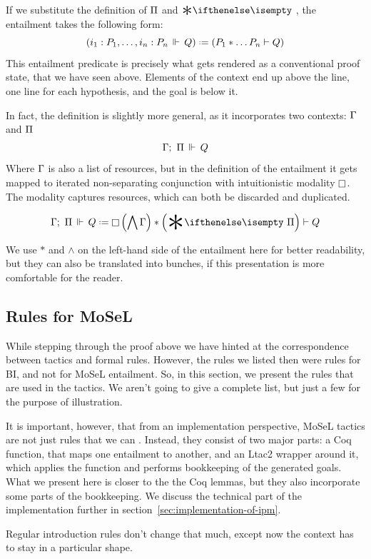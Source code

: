 If we substitute the definition of \(\Pi\) and \(\Sep\), the entailment takes the following form:
\[\left( \entailsOne {i_1 : P_1, \ldots , i_n : P_n} Q \right) \defeq
  \left( P_1 * \ldots P_n \vdash Q \right)\]
This entailment predicate is precisely what gets rendered as a conventional proof state, that we have seen above.
Elements of the context end up above the line, one line for each hypothesis, and the goal is below it.

In fact, the definition is slightly more general, as it incorporates two contexts: \(\Gamma\) and \(\Pi\)
\[\Gamma ;\,\, \Pi \,\Vdash\, Q\]
Where \(\Gamma\) is also a list of resources, but in the definition of the entailment it gets mapped to iterated non-separating conjunction with intuitionistic modality \(\mathop{\Box}\).
The modality captures resources, which can both be discarded and duplicated.

\[\entailsD Q \defeq \intuit \left(\bigwedge \IntuD\right) * \left(\Sep \SpatD\right) \vdash Q\]

We use \(\ast\) and \(\wedge\) on the left-hand side of the entailment here for better readability, but they can also be translated into bunches, if this presentation is more comfortable for the reader.

\subsection{Rules for MoSeL}
\label{sec:rules-regular-ipm}

While stepping through the proof above we have hinted at the correspondence between tactics and formal rules.
However, the rules we listed then were rules for BI, and not for MoSeL entailment.
So, in this section, we present the rules that are used in the tactics.
We aren't going to give a complete list, but just a few for the purpose of illustration.

It is important, however, that from an implementation perspective, MoSeL tactics are not just rules that we can .
Instead, they consist of two major parts: a Coq function, that maps one entailment to another, and an Ltac2 wrapper around it, which applies the function and performs bookkeeping of the generated goals.
What we present here is closer to the the Coq lemmas, but they also incorporate some parts of the bookkeeping.
We discuss the technical part of the implementation further in section~\ref{sec:implementation-of-ipm}.

Regular introduction rules don't change that much, except now the context has to stay in a particular shape.

